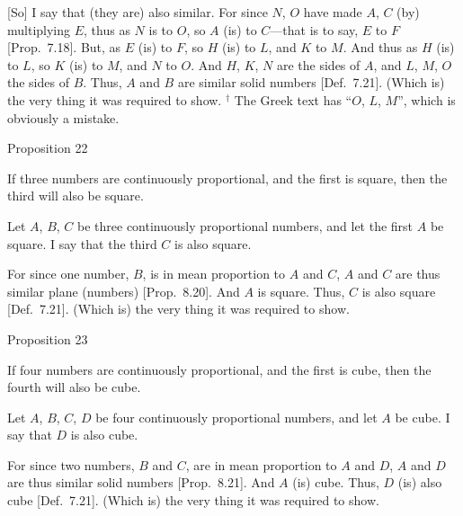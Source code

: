 \epsfysize=2in
\centerline{}

\mbox{[}So] I say that (they are) also similar. For since $N$, $O$ have made
$A$, $C$ (by) multiplying $E$, thus as $N$ is to $O$, so $A$ (is) to $C$---that is to say, $E$ to $F$ [Prop.~7.18]. But, as $E$
(is) to $F$, so $H$ (is) to $L$, and $K$ to $M$. And thus as $H$ (is) to $L$,
so $K$ (is) to $M$, and $N$ to $O$. And $H$, $K$, $N$
are the sides of $A$, and $L$, $M$, $O$ the sides of $B$. Thus,
$A$ and $B$ are similar solid numbers [Def.~7.21]. 
(Which is) the very thing it was required to show.
{\footnotesize\noindent$^\dag$ The Greek text has ``$O$, $L$, $M$'', which is obviously a mistake.}


\begin{center}
{\large Proposition 22}
\end{center}

If three numbers are continuously proportional,
and the first is  square, then the third will also be  square.

\epsfysize=0.8in
\centerline{}

Let $A$, $B$, $C$ be three continuously proportional numbers, and let the
first $A$ be  square. I say that the third $C$ is also  square.

For since one number, $B$, is in mean proportion to $A$ and $C$, $A$
and $C$ are thus similar plane (numbers) [Prop.~8.20]. And $A$ is  square.
Thus, $C$ is also square [Def.~7.21].
(Which is) the very thing it was required to show.


\begin{center}
{\large Proposition 23}
\end{center}

If four numbers are continuously proportional,
and the first is  cube, then the fourth will also be cube.

\epsfysize=1.2in
\centerline{}

Let $A$, $B$, $C$, $D$ be four continuously proportional numbers, and
let $A$ be cube. I say that $D$ is also  cube.

For since two numbers, $B$ and $C$, are in mean proportion to $A$ and
$D$, $A$ and $D$ are thus similar solid numbers [Prop.~8.21]. And $A$ (is)  cube.
Thus, $D$ (is) also  cube   [Def.~7.21].
(Which is) the very thing it was required to show.

